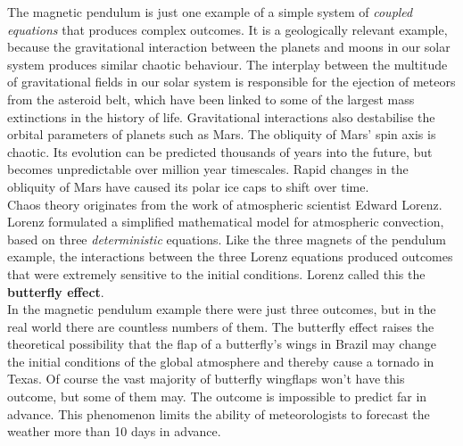 The magnetic pendulum is just one example of a simple system of
\emph{coupled equations} that produces complex outcomes. It is a
geologically relevant example, because the gravitational interaction
between the planets and moons in our solar system produces similar
chaotic behaviour.  The interplay between the multitude of
gravitational fields in our solar system is responsible for the
ejection of meteors from the asteroid belt, which have been linked to
some of the largest mass extinctions in the history of
life. Gravitational interactions also destabilise the orbital
parameters of planets such as Mars. The obliquity of Mars' spin axis
is chaotic. Its evolution can be predicted thousands of years into the
future, but becomes unpredictable over million year timescales. Rapid
changes in the obliquity of Mars have caused its polar ice caps to
shift over time.\\

Chaos theory originates from the work of atmospheric scientist Edward
Lorenz. Lorenz formulated a simplified mathematical model for
atmospheric convection, based on three \emph{deterministic} equations.
Like the three magnets of the pendulum example, the interactions
between the three Lorenz equations produced outcomes that were
extremely sensitive to the initial conditions. Lorenz called this the
\textbf{butterfly effect}.\\

In the magnetic pendulum example there were just three outcomes, but
in the real world there are countless numbers of them. The butterfly
effect raises the theoretical possibility that the flap of a
butterfly's wings in Brazil may change the initial conditions of the
global atmosphere and thereby cause a tornado in Texas. Of course the
vast majority of butterfly wingflaps won't have this outcome, but some
of them may. The outcome is impossible to predict far in advance.
This phenomenon limits the ability of meteorologists to forecast the
weather more than 10 days in advance.
